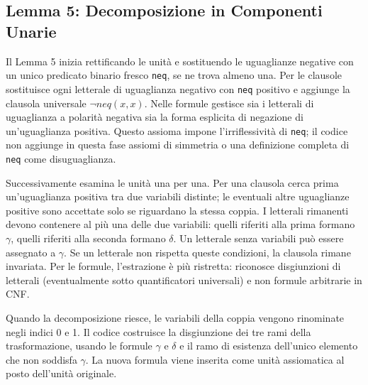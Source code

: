 \newpage
\subsection{Lemma 5: Decomposizione in Componenti Unarie}
\label{subsec:lemma5_impl}

Il Lemma 5 inizia rettificando le unità e sostituendo le uguaglianze negative con un unico predicato binario fresco \texttt{neq}, se ne trova almeno una. Per le clausole sostituisce ogni letterale di uguaglianza negativo con \texttt{neq} positivo e aggiunge la clausola universale $\neg neq(x,x)$. Nelle formule gestisce sia i letterali di uguaglianza a polarità negativa sia la forma esplicita di negazione di un'uguaglianza positiva. Questo assioma impone l'irriflessività di \texttt{neq}; il codice non aggiunge in questa fase assiomi di simmetria o una definizione completa di \texttt{neq} come disuguaglianza.

Successivamente esamina le unità una per una. Per una clausola cerca prima un'uguaglianza positiva tra due variabili distinte; le eventuali altre uguaglianze positive sono accettate solo se riguardano la stessa coppia. I letterali rimanenti devono contenere al più una delle due variabili: quelli riferiti alla prima formano $\gamma$, quelli riferiti alla seconda formano $\delta$. Un letterale senza variabili può essere assegnato a $\gamma$. Se un letterale non rispetta queste condizioni, la clausola rimane invariata. Per le formule, l'estrazione è più ristretta: riconosce disgiunzioni di letterali (eventualmente sotto quantificatori universali) e non formule arbitrarie in CNF.

Quando la decomposizione riesce, le variabili della coppia vengono rinominate negli indici 0 e 1. Il codice costruisce la disgiunzione dei tre rami della trasformazione, usando le formule $\gamma$ e $\delta$ e il ramo di esistenza dell'unico elemento che non soddisfa $\gamma$. La nuova formula viene inserita come unità assiomatica al posto dell'unità originale.

